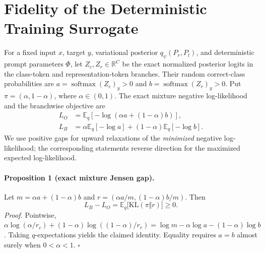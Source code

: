 \section{Fidelity of the Deterministic Training Surrogate}
\label{app:objective_fidelity}
For a fixed input $x$, target $y$, variational posterior $q_\psi(P_r,P_t)$,
and deterministic prompt parameters $\Phi$, let $Z_c,Z_r\in\mathbb R^C$
be the exact normalized posterior logits in the class-token and
representation-token branches. Their random correct-class probabilities
are $a=\operatorname{softmax}(Z_c)_y>0$ and
$b=\operatorname{softmax}(Z_r)_y>0$. Put
$\pi=(\alpha,1-\alpha)$, where $\alpha\in(0,1)$.
The exact mixture negative log-likelihood and the branchwise objective are
\begin{align}
L_O&=\mathbb E_q[-\log(\alpha a+(1-\alpha)b)],\\
L_B&=\alpha\mathbb E_q[-\log a]+(1-\alpha)\mathbb E_q[-\log b].
\end{align}
We use positive gaps for upward relaxations of the \emph{minimized} negative
log-likelihood; the corresponding statements reverse direction for the
maximized expected log-likelihood.

\paragraph{Proposition 1 (exact mixture Jensen gap).}
Let $m=\alpha a+(1-\alpha)b$ and $r=(\alpha a/m,(1-\alpha)b/m)$.
Then
\begin{equation}
L_B-L_O=\mathbb E_q\big[\mathrm{KL}(\pi\Vert r)\big]\ge0.
\label{eq:mix_exact}
\end{equation}
\emph{Proof.} Pointwise,
$\alpha\log(\alpha/r_c)+(1-\alpha)\log((1-\alpha)/r_r)
=\log m-\alpha\log a-(1-\alpha)\log b$.
Taking $q$-expectations yields the claimed identity. Equality requires
$a=b$ almost surely when $0<\alpha<1$. \hfill$\square$

